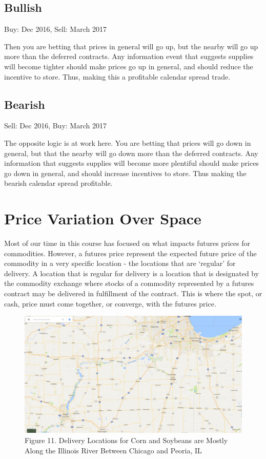 \documentclass[]{book}
\theoremstyle{definition}
\theoremstyle{definition}
\theoremstyle{remark}
\begin{document}
\subsection{Bullish}\label{bullish}

Buy: Dec 2016, Sell: March 2017

Then you are betting that prices in general will go up, but the nearby
will go up more than the deferred contracts. Any information event that
suggests supplies will become tighter should make prices go up in
general, and should reduce the incentive to store. Thus, making this a
profitable calendar spread trade.

\subsection{Bearish}\label{bearish}

Sell: Dec 2016, Buy: March 2017

The opposite logic is at work here. You are betting that prices will go
down in general, but that the nearby will go down more than the deferred
contracts. Any information that suggests supplies will become more
plentiful should make prices go down in general, and should increase
incentives to store. Thus making the bearish calendar spread profitable.

\section{Price Variation Over Space}\label{price-variation-over-space}

Most of our time in this course has focused on what impacts futures
prices for commodities. However, a futures price represent the expected
future price of the commodity in a very specific location - the
locations that are `regular' for delivery. A location that is regular
for delivery is a location that is designated by the commodity exchange
where stocks of a commodity represented by a futures contract may be
delivered in fulfillment of the contract. This is where the spot, or
cash, price must come together, or converge, with the futures price.

\begin{figure}[htbp]
\centering
\includegraphics{images/IL-River.png}
\caption{Figure 11. Delivery Locations for Corn and Soybeans are Mostly
Along the Illinois River Between Chicago and Peoria, IL}
\end{figure}
\end{document}
